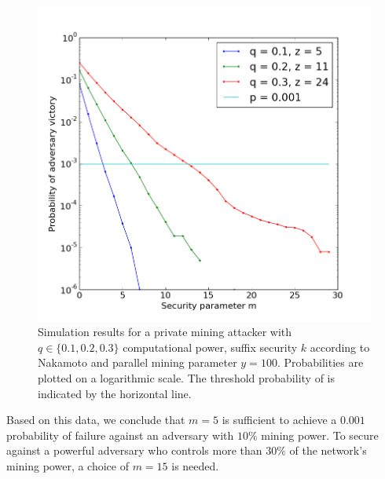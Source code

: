 \begin{figure}
    \caption{\label{fig.nipopow-attack-experiment}
        Simulation results for a private mining attacker with $q \in \{0.1,
        0.2, 0.3\}$ computational power, suffix security $k$ according to
        Nakamoto and parallel mining parameter $y = 100$. Probabilities are
        plotted on a logarithmic scale. The threshold probability of
        \cite{bitcoin} is indicated by the horizontal line.
    }
    \centering
    \includegraphics[width=\columnwidth,keepaspectratio]{figures/nipopow-attack-experiment.png}
\end{figure}

Based on this data, we conclude that $m = 5$ is sufficient to achieve a $0.001$
probability of failure against an adversary with $10\%$ mining power. To secure
against a powerful adversary who controls more than $30\%$ of the network's
mining power, a choice of $m = 15$ is needed.
